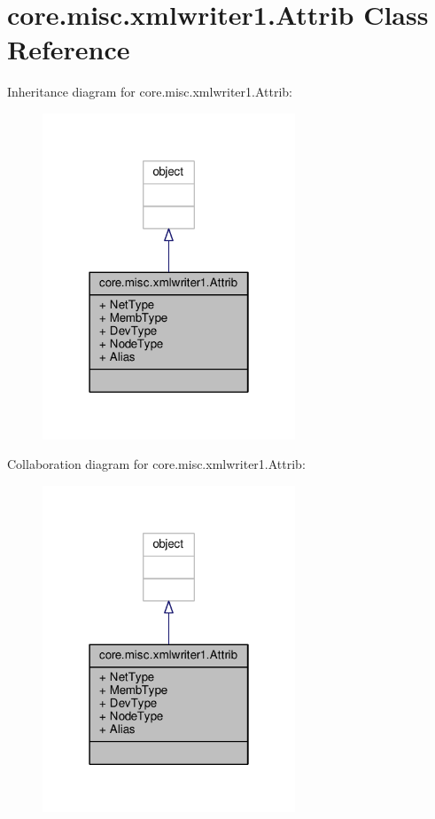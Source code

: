 \hypertarget{classcore_1_1misc_1_1xmlwriter1_1_1_attrib}{\section{core.\+misc.\+xmlwriter1.\+Attrib Class Reference}
\label{classcore_1_1misc_1_1xmlwriter1_1_1_attrib}
}


Inheritance diagram for core.\+misc.\+xmlwriter1.\+Attrib\+:
\nopagebreak
\begin{figure}[H]
\begin{center}
\leavevmode
\includegraphics[width=214pt]{classcore_1_1misc_1_1xmlwriter1_1_1_attrib__inherit__graph}
\end{center}
\end{figure}


Collaboration diagram for core.\+misc.\+xmlwriter1.\+Attrib\+:
\nopagebreak
\begin{figure}[H]
\begin{center}
\leavevmode
\includegraphics[width=214pt]{classcore_1_1misc_1_1xmlwriter1_1_1_attrib__coll__graph}
\end{center}
\end{figure}

